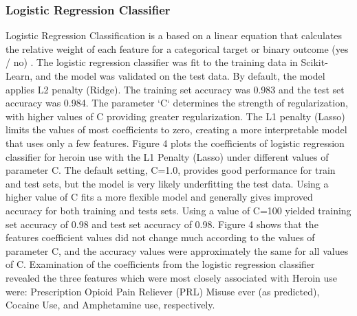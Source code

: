 \documentclass[sigconf]{acmart}
\begin{document}
\subsubsection{Logistic Regression Classifier}
 
Logistic Regression Classification is a based on a linear equation that 
calculates the relative weight of each feature for a categorical target or 
binary outcome (yes / no) \cite{raschka17}. The logistic regression classifier 
was fit to the training data in Scikit-Learn, and the model was validated on 
the test data. By default, the model applies L2 penalty (Ridge). The training 
set accuracy was 0.983 and the test set accuracy was 0.984. The parameter `C` 
determines the strength of regularization, with higher values of C providing
greater regularization. The L1 penalty (Lasso) limits the values of most 
coefficients to zero, creating a more interpretable model that uses only a 
few features. Figure 4 plots the coefficients of logistic regression classifier 
for heroin use with the L1 Penalty (Lasso) under different values of parameter 
C. The default setting, C=1.0, provides good performance for train and test 
sets, but the model is very likely underfitting the test data. Using a higher
value of C fits a more flexible model and generally gives improved accuracy 
for both training and tests sets. Using a value of C=100 yielded training set
accuracy of 0.98 and test set accuracy of 0.98. Figure 4 shows that the 
features coefficient values did not change much according to the values of
parameter C, and the accuracy values were approximately the same for all 
values of C. Examination of the coefficients from the logistic regression 
classifier revealed the three features which were most closely associated 
with Heroin use were: Prescription Opioid Pain Reliever (PRL) Misuse ever 
(as predicted), Cocaine Use, and Amphetamine use, respectively.
\end{document}
